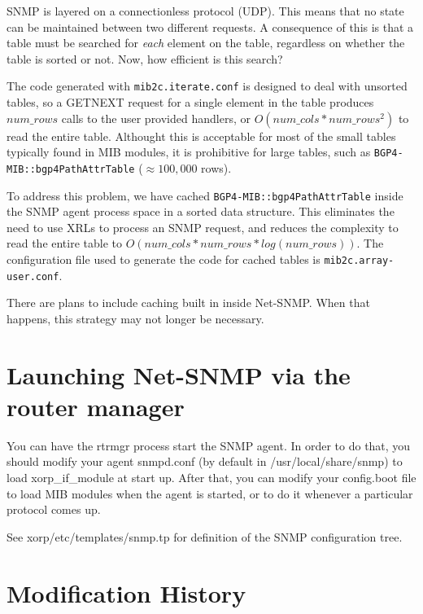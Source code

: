 \documentclass[11pt]{article}
\begin{document}
SNMP is layered on a connectionless protocol (UDP).  This means that no state
can be maintained between two different requests.  A consequence of this is
that a table must be searched for \emph{each} element on the table,
regardless on whether the table is sorted or not.  Now, how efficient is this
search?

The code generated with \texttt{mib2c.iterate.conf} is designed to deal with
unsorted tables, so a GETNEXT request for a single element in the table
produces $num\_rows$ calls to the user provided handlers, or
$O(num\_cols*num\_rows^{2})$ to read the entire table.  Althought this is
acceptable for most of the small tables typically found in MIB modules, it is
prohibitive for large tables, such as \texttt{BGP4-MIB::bgp4PathAttrTable}
($\approx100,000$ rows).  

To address this problem, we have cached \texttt{BGP4-MIB::bgp4PathAttrTable} 
inside the SNMP agent process space in a sorted data structure.  This
eliminates the need to use XRLs to process an SNMP request, and reduces the
complexity to read the entire table to $O(num\_cols*num\_rows*log(num\_rows))$.
The configuration file used to generate the code for cached tables is
\texttt{mib2c.array-user.conf}.

There are plans to include caching built in inside Net-SNMP.  When that
happens, this strategy may not longer be necessary. 

\section{Launching Net-SNMP via the router manager}

You can have the rtrmgr process start the SNMP agent.  In order to do that, you
should modify your agent snmpd.conf (by default in /usr/local/share/snmp) to
load xorp\_if\_module at start up. After that, you can modify your config.boot
file to load MIB modules when the agent is started, or to do it whenever a
particular protocol comes up. 

See xorp/etc/templates/snmp.tp for definition of the SNMP configuration tree.



\appendix
\section{Modification History}
\end{document}

